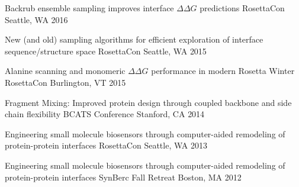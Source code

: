 

\begin{cventries}

  \cventry
  {Backrub ensemble sampling improves interface $\Delta\Delta G$ predictions} %
  {RosettaCon} %
  {Seattle, WA} %
  {2016} %
  {}

  \cventry
  {New (and old) sampling algorithms for efficient exploration of interface sequence/structure space} %
  {RosettaCon} %
  {Seattle, WA} %
  {2015} %
  {}

  \cventry
  {Alanine scanning and monomeric $\Delta\Delta G$ performance in modern Rosetta} %
  {Winter RosettaCon} %
  {Burlington, VT} %
  {2015} %
  {}

  \cventry
  {Fragment Mixing: Improved protein design through coupled backbone and side chain flexibility} %
  {BCATS Conference} %
  {Stanford, CA} %
  {2014} %
  {}


  \cventry
  {Engineering small molecule biosensors through computer-aided remodeling of protein-protein interfaces} %
  {RosettaCon} %
  {Seattle, WA} %
  {2013} %
  {}

  \cventry
  {Engineering small molecule biosensors through computer-aided remodeling of protein-protein interfaces} %
  {SynBerc Fall Retreat} %
  {Boston, MA} %
  {2012} %
  {}

\end{cventries}
